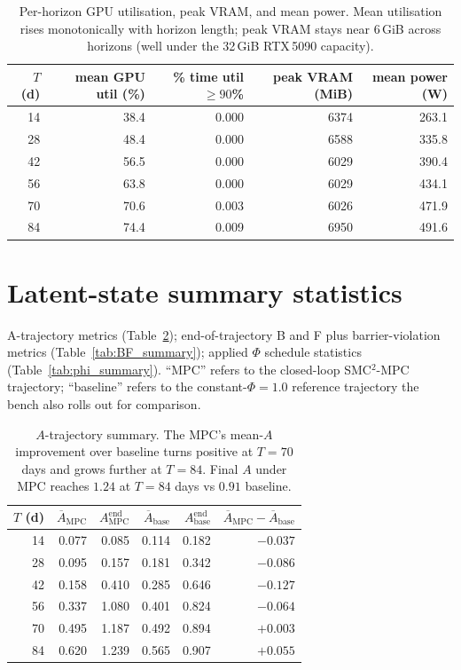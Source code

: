 \documentclass[11pt,a4paper]{article}
\begin{document}
\begin{table}[ht]
\centering
\small
\begin{tabular}{rrrrr}
\toprule
$T$ (d) & mean GPU util (\%) & \% time util $\geq 90$\% & peak VRAM (MiB) & mean power (W) \\
\midrule
14 & 38.4 & 0.000 & 6374 & 263.1 \\
28 & 48.4 & 0.000 & 6588 & 335.8 \\
42 & 56.5 & 0.000 & 6029 & 390.4 \\
56 & 63.8 & 0.000 & 6029 & 434.1 \\
70 & 70.6 & 0.003 & 6026 & 471.9 \\
84 & 74.4 & 0.009 & 6950 & 491.6 \\
\bottomrule
\end{tabular}
\caption{Per-horizon GPU utilisation, peak VRAM, and mean power.
Mean utilisation rises monotonically with horizon length; peak VRAM
stays near 6\,GiB across horizons (well under the 32\,GiB
RTX\,5090 capacity).}
\label{tab:gpu_efficiency}
\end{table}


\section{Latent-state summary statistics}
\label{sec:latent}

A-trajectory metrics (Table~\ref{tab:A_summary}); end-of-trajectory
B and F plus barrier-violation metrics (Table~\ref{tab:BF_summary});
applied $\Phi$ schedule statistics (Table~\ref{tab:phi_summary}).
``MPC'' refers to the closed-loop SMC$^2$-MPC trajectory; ``baseline''
refers to the constant-$\Phi = 1.0$ reference trajectory the bench
also rolls out for comparison.

\begin{table}[ht]
\centering
\small
\begin{tabular}{rrrrrr}
\toprule
$T$ (d) & $\overline{A}_{\mathrm{MPC}}$ & $A^{\mathrm{end}}_{\mathrm{MPC}}$ & $\overline{A}_{\mathrm{base}}$ & $A^{\mathrm{end}}_{\mathrm{base}}$ & $\overline{A}_{\mathrm{MPC}} - \overline{A}_{\mathrm{base}}$ \\
\midrule
14 & 0.077 & 0.085 & 0.114 & 0.182 & $-0.037$ \\
28 & 0.095 & 0.157 & 0.181 & 0.342 & $-0.086$ \\
42 & 0.158 & 0.410 & 0.285 & 0.646 & $-0.127$ \\
56 & 0.337 & 1.080 & 0.401 & 0.824 & $-0.064$ \\
70 & 0.495 & 1.187 & 0.492 & 0.894 & $+0.003$ \\
84 & 0.620 & 1.239 & 0.565 & 0.907 & $+0.055$ \\
\bottomrule
\end{tabular}
\caption{$A$-trajectory summary. The MPC's mean-$A$ improvement over
baseline turns positive at $T = 70$ days and grows further at $T =
84$. Final $A$ under MPC reaches $1.24$ at $T = 84$ days vs
$0.91$ baseline.}
\label{tab:A_summary}
\end{table}
\end{document}
